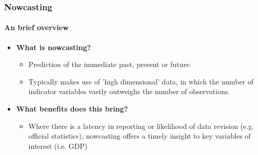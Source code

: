 \begin{frame}
    \frametitle{Nowcasting}
    \framesubtitle{An brief overview} 
\begin{itemize}
    \item \textbf{What is nowcasting?} 
    \begin{itemize}
        \item Prediction of the immediate past, present or future. 
        \item Typically makes use of 'high dimensional' data, in which the number of indicator variables vastly outweighs the number of observations.    
    \end{itemize}
\end{itemize}
\vspace{5mm}
 \begin{itemize}
     \item \textbf{What benefits does this bring?}
     \begin{itemize}
         \item  Where there is a latency in reporting or likelihood of data revision (e.g. official statistics), nowcasting offers a timely insight to key variables of interest (i.e. GDP)    
     \end{itemize}
 \end{itemize}
    






\end{frame}  